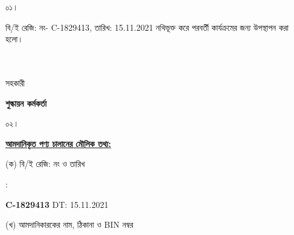 \documentclass[12pt]{article}
\newcommand{\beno}{C-1829413}
\newcommand{\bedt}{15.11.2021}
\begin{document}
\vspace*{5MM}
\noindent
\begin{minipage}[t]{0.05\linewidth}
০১।
\end{minipage}
\begin{minipage}[t]{0.95\linewidth}
বি/ই রেজি: নং- {\beno}, তারিখ: {\bedt}
নথিভূক্ত করে
পরবর্তী কার্যক্রমের জন্য উপস্থাপন করা হলো।
\\
\\
\\
\end{minipage}
\begin{minipage}[t]{0.05\linewidth}
\hspace*{1em}
\end{minipage}
\begin{minipage}[t]{0.05\linewidth}
সহকারী
\end{minipage}
\begin{minipage}[t]{0.40\linewidth}
\hspace{1em}
\end{minipage}
\begin{minipage}[t]{0.50\linewidth}
\textbf{শুল্কায়ন কর্মকর্তা}
\\
\end{minipage}
\begin{minipage}[t]{0.05\linewidth}
০২।
\end{minipage}
\begin{minipage}[t]{0.95\linewidth}
\underline{\textbf {আমদানিকৃত পণ্য চালানের
মৌলিক তথ্য:}}
\\
\end{minipage}
\footnotesize
\begin{minipage}[t]{0.05\linewidth}
\hspace*{1em}
\end{minipage}
\begin{minipage}[t]{0.45\linewidth}
(ক) বি/ই রেজি: নং ও তারিখ
\end{minipage}
\begin{minipage}[t]{0.02\linewidth}
:
\end{minipage}
\begin{minipage}[t]{0.50\linewidth}
\textbf{{\beno}} \hspace{2em} DT: {\bedt}
\\
\end{minipage}
\begin{minipage}[t]{0.05\linewidth}
\hspace*{1em}
\end{minipage}
\begin{minipage}[t]{0.45\linewidth}
(খ) আমদানিকারকের নাম, ঠিকানা
ও BIN নম্বর
\end{minipage}
\end{document}

